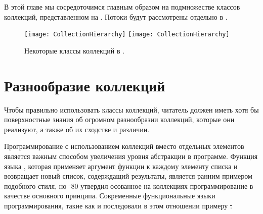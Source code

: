 \documentclass[a4paper,10pt,twoside]{book}
\begin{document}
В этой главе мы сосредоточимся главным образом на подмножестве классов коллекций, представленном на .
Потоки будут рассмотрены отдельно в .



\begin{figure}
\begin{center}
\ifluluelse
	{\texttt{[image: CollectionHierarchy]}}
	{\texttt{[image: CollectionHierarchy]}}
\caption{Некоторые классы коллекций в \pharo.}
\end{center}
\end{figure}

\section{Разнообразие коллекций}

Чтобы правильно использовать классы коллекций, читатель должен иметь хотя бы поверхностные знания об огромном разнообразии коллекций, которые они реализуют, а также об их сходстве и различии.

Программирование с использованием коллекций вместо отдельных элементов является важным способом увеличения уровня абстракции в программе.
Функция  языка , которая применяет аргумент функции к каждому элементу списка и возвращает новый список, содерждащий результаты, является ранним примером подобного стиля, но \st-80 утвердил осованное на коллекциях программирование в качестве основного принципа. Современные функциональные языки программирования, такие как  и  последовали в этом отношении примеру \st.
\end{document}
